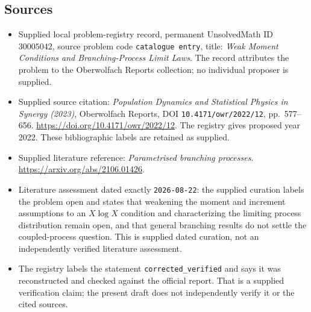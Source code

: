\documentclass[11pt]{article}
\begin{document}
\subsection{Sources}
\begin{itemize}
\item Supplied local problem-registry record, permanent UnsolvedMath ID \(30005042\), source problem code \texttt{catalogue entry}, title: \emph{Weak Moment Conditions and Branching-Process Limit Laws}. The record attributes the problem to the Oberwolfach Reports collection; no individual proposer is supplied.
\item Supplied source citation: \emph{Population Dynamics and Statistical Physics in Synergy (2023)}, Oberwolfach Reports, DOI \texttt{10.4171/owr/2022/12}, pp.~577--656. \url{https://doi.org/10.4171/owr/2022/12}. The registry gives proposed year 2022. These bibliographic labels are retained as supplied.
\item Supplied literature reference: \emph{Parametrised branching processes}. \url{https://arxiv.org/abs/2106.01426}.
\item Literature assessment dated exactly \texttt{2026-08-22}: the supplied curation labels the problem open and states that weakening the moment and increment assumptions to an \(X\log X\) condition and characterizing the limiting process distribution remain open, and that general branching results do not settle the coupled-process question. This is supplied dated curation, not an independently verified literature assessment.
\item The registry labels the statement \texttt{corrected\_verified} and says it was reconstructed and checked against the official report. That is a supplied verification claim; the present draft does not independently verify it or the cited sources.
\end{itemize}
\end{document}

